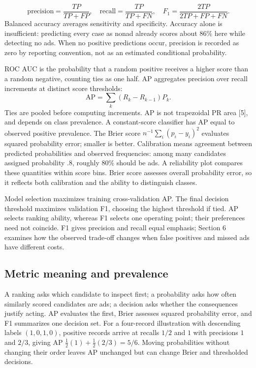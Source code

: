 \documentclass[11pt,a4paper]{article}
\begin{document}
\[\mathrm{precision}=\frac{TP}{TP+FP},\quad \mathrm{recall}=\frac{TP}{TP+FN},\quad F_1=\frac{2TP}{2TP+FP+FN}.\]
Balanced accuracy averages sensitivity and specificity. Accuracy alone is insufficient: predicting every case as nonad already scores about 86\% here while detecting no ads. When no positive predictions occur, precision is recorded as zero by reporting convention, not as an estimated conditional probability.

ROC AUC is the probability that a random positive receives a higher score than a random negative, counting ties as one half. AP aggregates precision over recall increments at distinct score thresholds:
\[\mathrm{AP}=\sum_k(R_k-R_{k-1})P_k.\]
Ties are pooled before computing increments. AP is not trapezoidal PR area [5], and depends on class prevalence. A constant-score classifier has AP equal to observed positive prevalence. The Brier score $n^{-1}\sum_i(p_i-y_i)^2$ evaluates squared probability error; smaller is better. Calibration means agreement between predicted probabilities and observed frequencies: among many candidates assigned probability .8, roughly 80\% should be ads. A reliability plot compares these quantities within score bins. Brier score assesses overall probability error, so it reflects both calibration and the ability to distinguish classes.

Model selection maximizes training cross-validation AP. The final decision threshold maximizes validation F1, choosing the highest threshold if tied. AP selects ranking ability, whereas F1 selects one operating point; their preferences need not coincide. F1 gives precision and recall equal emphasis; Section 6 examines how the observed trade-off changes when false positives and missed ads have different costs.

\subsection{Metric meaning and prevalence}
A ranking asks which candidate to inspect first; a probability asks how often similarly scored candidates are ads; a decision asks whether the consequences justify acting. AP evaluates the first, Brier assesses squared probability error, and F1 summarizes one decision set. For a four-record illustration with descending labels $(1,0,1,0)$, positive records arrive at recalls $1/2$ and $1$ with precisions $1$ and $2/3$, giving AP $\tfrac12(1)+\tfrac12(2/3)=5/6$. Moving probabilities without changing their order leaves AP unchanged but can change Brier and thresholded decisions.
\end{document}
